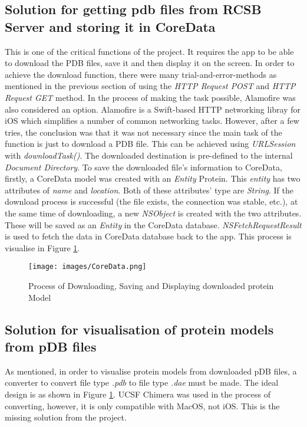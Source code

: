 \subsection{Solution for getting pdb files from RCSB Server and storing it in CoreData}
This is one of the critical functions of the project. It requires the app to be able to download the PDB files, save it and then display it on the screen. 
In order to achieve the download function, there were many trial-and-error-methods as mentioned in the previous section of using the \emph{HTTP Request POST} and \emph{HTTP Request GET} method. In the process of making the task possible, Alamofire was also considered an option. Alamofire is a Swift-based HTTP networking libray for iOS which simplifies a number of common networking tasks. However, after a few tries, the conclusion was that it was not necessary since the main task of the function is just to download a PDB file. This can be achieved using \emph{URLSession} with \emph{downloadTask()}. The downloaded destination is pre-defined to the internal \emph{Document Directory}. 
To save the downloaded file’s information to CoreData, firstly, a CoreData model was created with an \emph{Entity} Protein. This \emph{entity} has two attributes of \emph{name} and \emph{location}. Both of these attributes’ type are \emph{String}. If the download process is successful (the file exists, the connection was stable, etc.), at the same time of downloading, a new \emph{NSObject} is created with the two attributes. These will be saved as an \emph{Entity} in the CoreData database. 
\emph{NSFetchRequestResult} is used to fetch the data in CoreData database back to the app. This process is visualise in Figure \ref{fig:coredata}.

\begin{figure}[!htp]
	\centering
	\texttt{[image: images/CoreData.png]}
	\caption{Process of Downloading, Saving and Displaying downloaded protein Model}
	\label{fig:coredata}
\end{figure}


\subsection{Solution for visualisation of protein models from pDB files}
As mentioned, in order to visualise protein models from downloaded pDB files, a converter to convert file type \emph{.pdb} to file type \emph{.dae} must be made. The ideal design is as shown in Figure \ref{fig:coredata}. UCSF Chimera was used in the process of converting, however, it is only compatible with MacOS, not iOS. This is the missing solution from the project. 

